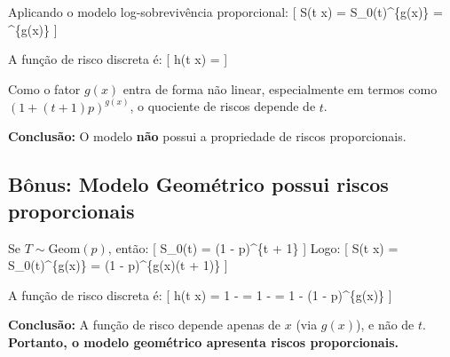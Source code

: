 \documentclass[
  letterpaper,
  DIV=11,
  numbers=noendperiod]{scrartcl}
\begin{document}
Aplicando o modelo log-sobrevivência proporcional: {[} S(t \mid x) =
S\_0(t)\^{}\{g(x)\} =
\left[ (1 - p)^{t+1}(1 + (t+1)p) \right]\^{}\{g(x)\} {]}

A função de risco discreta é: {[} h(t \mid x) =
 {]}

Como o fator \(g(x)\) entra de forma não linear, especialmente em termos
como \((1 + (t+1)p)^{g(x)}\), o quociente de riscos depende de \(t\).

\textbf{Conclusão:} O modelo \textbf{não} possui a propriedade de riscos
proporcionais.

\subsection*{Bônus: Modelo Geométrico possui riscos proporcionais}

Se \(T \sim \text{Geom}(p)\), então: {[} S\_0(t) = (1 - p)\^{}\{t + 1\}
{]} Logo: {[} S(t \mid x) = S\_0(t)\^{}\{g(x)\} = (1 - p)\^{}\{g(x)(t +
1)\} {]}

A função de risco discreta é: {[} h(t \mid x) = 1 -
 = 1 -
 = 1 - (1 -
p)\^{}\{g(x)\} {]}

\textbf{Conclusão:} A função de risco depende apenas de \(x\) (via
\(g(x)\)), e não de \(t\).
\textbf{Portanto, o modelo geométrico apresenta riscos proporcionais.}
\end{document}
